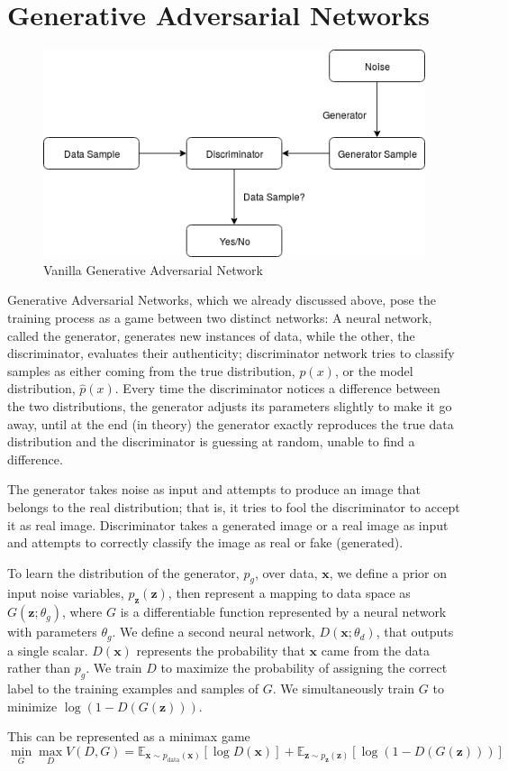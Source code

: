 \section{Generative Adversarial Networks} %
\label{sec:generative_adversarial_networks}
\begin{figure}[H]
\centering\includegraphics[width=.7\textwidth]{images/vanillaGAN.png}
\caption{Vanilla Generative Adversarial Network}
\label{fig:gans}
\end{figure}
Generative Adversarial Networks, which we already discussed above, pose the training process as a game between two distinct networks: A neural network, called the generator, generates new instances of data, while the other, the discriminator, evaluates their authenticity; discriminator network tries to classify samples as either coming from the true distribution, $p(x)$, or the model distribution, $\hat{p}(x)$. Every time the discriminator notices a difference between the two distributions, the generator adjusts its parameters slightly to make it go away, until at the end (in theory) the generator exactly reproduces the true data distribution and the discriminator is guessing at random, unable to find a difference.\par\bigskip
The generator takes noise as input and attempts to produce an image that belongs to the real distribution; that is, it tries to fool the discriminator to accept it as real image. Discriminator takes a generated image or a real image as input and attempts to correctly classify the image as real or fake (generated).\par\bigskip
To learn the distribution of the generator, $p_g$, over data, $\bm{x}$, we define a prior on input noise variables, $p_{\bm{z}}(\bm{z})$, then represent a mapping to data space as $G(\bm{z}; \theta_g)$, where $G$ is a differentiable function represented by a neural network with parameters $\theta_g$. We define a second neural network, $D(\bm{x}; \theta_d)$, that outputs a single scalar. $D(\bm{x})$ represents the probability that $\bm{x}$ came from the data rather than $p_g$. We train $D$ to maximize the probability of assigning the correct label to the training examples and samples of $G$. We simultaneously train $G$ to minimize $\log(1-D(G(\bm{z})))$.\par\bigskip
\noindent This can be represented as a minimax game \\
\begin{equation} \label{eu_eqn}
\min_{G} \max_{D} V(D, G)=\mathbb{E}_{\bm{x} \sim p_{\text{data}}(\bm{x})}[\log D(\bm{x})]+\mathbb{E}_{\bm{z} \sim p_{\bm{z}}(\bm{z})}[\log (1 - D(G(\bm{z})))]
\end{equation}


